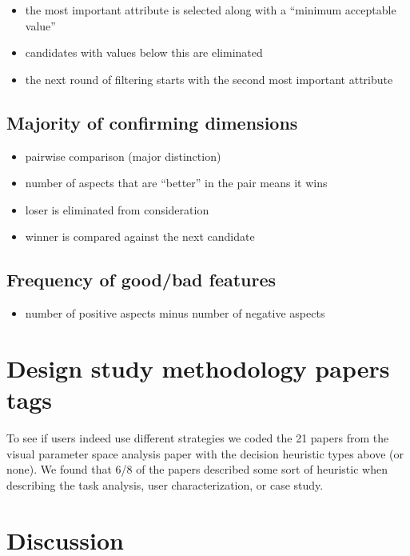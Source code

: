 \begin{itemize}
\tightlist
\item
  the most important attribute is selected along with a ``minimum
  acceptable value''
\item
  candidates with values below this are eliminated
\item
  the next round of filtering starts with the second most important
  attribute
\end{itemize}

\subsection{Majority of confirming
dimensions}\label{majority-of-confirming-dimensions}

\begin{itemize}
\tightlist
\item
  pairwise comparison (major distinction)
\item
  number of aspects that are ``better'' in the pair means it wins
\item
  loser is eliminated from consideration
\item
  winner is compared against the next candidate
\end{itemize}

\subsection{Frequency of good/bad
features}\label{frequency-of-goodbad-features}

\begin{itemize}
\tightlist
\item
  number of positive aspects minus number of negative aspects
\end{itemize}

\section{Design study methodology papers
tags}\label{design-study-methodology-papers-tags}

To see if users indeed use different strategies we coded the 21 papers
from the visual parameter space analysis paper \citep{Sedlmair:2014}
with the decision heuristic types above (or none). We found that 6/8 of
the papers described some sort of heuristic when describing the task
analysis, user characterization, or case study.

\section{Discussion}\label{discussion}

